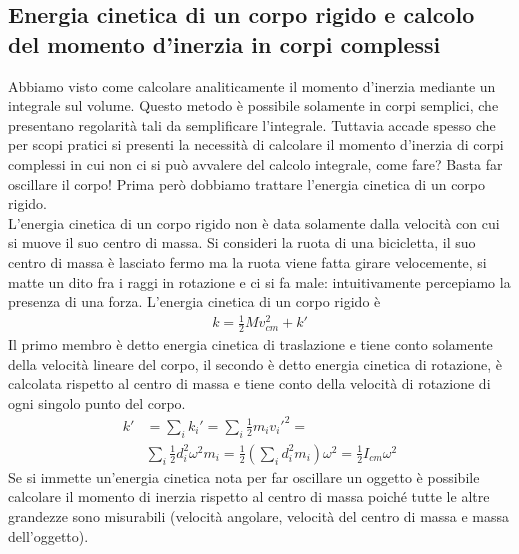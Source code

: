 \subsection{Energia cinetica di un corpo rigido e calcolo del momento d'inerzia in corpi complessi}
Abbiamo visto come calcolare analiticamente il momento d'inerzia mediante un integrale sul volume. Questo metodo è possibile solamente in corpi semplici, che presentano regolarità tali da semplificare l'integrale. Tuttavia accade spesso che per scopi pratici si presenti la necessità di calcolare il momento d'inerzia di corpi complessi in cui non ci si può avvalere del calcolo integrale, come fare? Basta far oscillare il corpo! Prima però dobbiamo trattare l'energia cinetica di un corpo rigido.\\
L'energia cinetica di un corpo rigido non è data solamente dalla velocità con cui si muove il suo centro di massa. Si consideri la ruota di una bicicletta, il suo centro di massa è lasciato fermo ma la ruota viene fatta girare velocemente, si matte un dito fra i raggi in rotazione e ci si fa male: intuitivamente percepiamo la presenza di una forza. L'energia cinetica di un corpo rigido è
\begin{align*}
	k = \frac{1}{2}M v_{cm}^2 + k'
\end{align*}
Il primo membro è detto energia cinetica di traslazione e tiene conto solamente della velocità lineare del corpo, il secondo è detto energia cinetica di rotazione, è calcolata rispetto al centro di massa e tiene conto della velocità di rotazione di ogni singolo punto del corpo.
\begin{align*}
	k' &= \sum_i k_i'= \sum_i \frac{1}{2}m_i v_i'^2 =\\
	&\sum_i \frac{1}{2} d_i^2 \omega^2 m_i = \frac{1}{2} (\sum_i d_i^2 m_i) \omega^2 = \frac{1}{2} I_{cm} \omega^2
\end{align*}
Se si immette un'energia cinetica nota per far oscillare un oggetto è possibile calcolare il momento di inerzia rispetto al centro di massa poiché tutte le altre grandezze sono misurabili (velocità angolare, velocità del centro di massa e massa dell'oggetto).
